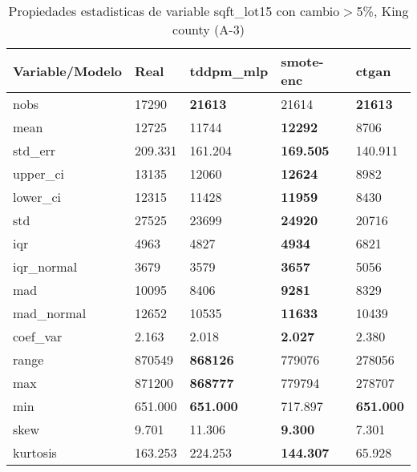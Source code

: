 \begin{table}[H]
\centering
\fontsize{8}{14}\selectfont
\caption{Propiedades estadisticas de variable sqft\_lot15 con cambio\ensuremath{>}5\%, King county (A-3)}
\label{table-stats-king county-a-3-sqft_lot15-short}
\begin{tabular}{|l|m{10em}|m{10em}|m{10em}|m{10em}|}
\hline
 \rowcolor[gray]{0.8}
Variable/Modelo & Real & tddpm\_mlp & smote-enc & ctgan \\
\hline nobs & 17290 & \bfseries 21613 & \cellcolor[rgb]{0.9, 0.54, 0.52} 21614 & \bfseries 21613 \\
\hline mean & 12725 & 11744 & \bfseries 12292 & \cellcolor[rgb]{0.9, 0.54, 0.52} 8706 \\
\hline std\_err & 209.331 & 161.204 & \bfseries 169.505 & \cellcolor[rgb]{0.9, 0.54, 0.52} 140.911 \\
\hline upper\_ci & 13135 & 12060 & \bfseries 12624 & \cellcolor[rgb]{0.9, 0.54, 0.52} 8982 \\
\hline lower\_ci & 12315 & 11428 & \bfseries 11959 & \cellcolor[rgb]{0.9, 0.54, 0.52} 8430 \\
\hline std & 27525 & 23699 & \bfseries 24920 & \cellcolor[rgb]{0.9, 0.54, 0.52} 20716 \\
\hline iqr & 4963 & 4827 & \bfseries 4934 & \cellcolor[rgb]{0.9, 0.54, 0.52} 6821 \\
\hline iqr\_normal & 3679 & 3579 & \bfseries 3657 & \cellcolor[rgb]{0.9, 0.54, 0.52} 5056 \\
\hline mad & 10095 & 8406 & \bfseries 9281 & \cellcolor[rgb]{0.9, 0.54, 0.52} 8329 \\
\hline mad\_normal & 12652 & 10535 & \bfseries 11633 & \cellcolor[rgb]{0.9, 0.54, 0.52} 10439 \\
\hline coef\_var & 2.163 & 2.018 & \bfseries 2.027 & \cellcolor[rgb]{0.9, 0.54, 0.52} 2.380 \\
\hline range & 870549 & \bfseries 868126 & 779076 & \cellcolor[rgb]{0.9, 0.54, 0.52} 278056 \\
\hline max & 871200 & \bfseries 868777 & 779794 & \cellcolor[rgb]{0.9, 0.54, 0.52} 278707 \\
\hline min & 651.000 & \bfseries 651.000 & \cellcolor[rgb]{0.9, 0.54, 0.52} 717.897 & \bfseries 651.000 \\
\hline skew & 9.701 & 11.306 & \bfseries 9.300 & \cellcolor[rgb]{0.9, 0.54, 0.52} 7.301 \\
\hline kurtosis & 163.253 & 224.253 & \bfseries 144.307 & \cellcolor[rgb]{0.9, 0.54, 0.52} 65.928 \\

\end{tabular}
\end{table}
